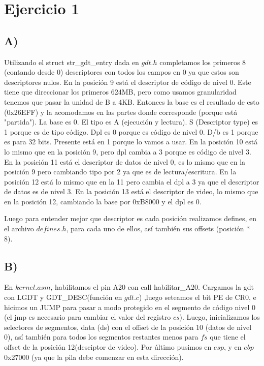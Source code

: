 \section{Ejercicio 1}
\subsection*{A)}
Utilizando el struct str\_gdt\_entry dada en $gdt.h$  completamos los primeros 8 (contando desde 0) descriptores con todos los campos en 0 ya que estos son descriptores nulos.\newline
En la posici\'on 9 est\'a el descriptor de c\'odigo de nivel 0. Este tiene que direccionar los primeros 624MB, pero como usamos granularidad tenemos que pasar la unidad de B a 4KB. 
Entonces la base es el resultado de esto (0x26EFF) y la acomodamos en las partes donde corresponde (porque est\'a "partida").
La base es 0. El tipo es A (ejecuci\'on y lectura). S (Descriptor type) es 1 porque es de tipo c\'odigo. Dpl es 0 porque es c\'odigo de nivel 0. D/b es 1 porque es para 32 bits. Presente est\'a en 1 porque lo vamos a usar. \newline
En la posici\'on 10 está lo mismo que en la posici\'on 9, pero dpl cambia a 3 porque es c\'odigo de nivel 3. \newline
En la posici\'on 11 est\'a el descriptor de datos de nivel 0, es lo mismo que en la posici\'on 9 pero cambiando tipo por 2 ya que es de lectura/escritura.\newline
En la posici\'on 12 está lo mismo que en la 11 pero cambia el dpl a 3 ya que el descriptor de datos es de nivel 3.
En la posici\'on 13 est\'a el descriptor de video, lo mismo que  en la posici\'on 12, cambiando la base por 0xB8000 y el dpl es 0. \newline

Luego para entender mejor que descriptor es cada posici\'on realizamos defines, en el archivo $defines.h$, para cada uno de ellos, as\'i tambi\'en sus offsets (posici\'on * 8).

\subsection*{B)}
En $kernel.asm$, habilitamos el pin A20 con call habilitar\_A20. Cargamos la gdt con LGDT y GDT\_DESC(función en $gdt.c$) ,luego seteamos el bit PE de CR0, e hicimos un JUMP 
para pasar a modo protegido en el segmento de c\'odigo nivel 0 (el jmp es necesario para cambiar el valor del registro $cs$).\newline
Luego, inicializamos los selectores de segmentos, data (ds) con el offset de la posici\'on 10 (datos de nivel 0), así también para todos los segmentos restantes menos para $fs$ que tiene el offset de la posici\'on 12(desciptor de video). 
Por \'ultimo pusimos en $esp$, y en $ebp$ 0x27000 (ya que la pila debe comenzar en esta direcci\'on).

